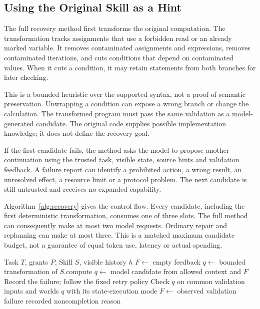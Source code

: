 \documentclass[conference]{IEEEtran}
\begin{document}
\subsection{Using the Original Skill as a Hint}
The full recovery method first transforms the original computation. The transformation tracks assignments that use a forbidden read or an already marked variable. It removes contaminated assignments and expressions, removes contaminated iterations, and cuts conditions that depend on contaminated values. When it cuts a condition, it may retain statements from both branches for later checking.

This is a bounded heuristic over the supported syntax, not a proof of semantic preservation. Unwrapping a condition can expose a wrong branch or change the calculation. The transformed program must pass the same validation as a model-generated candidate. The original code supplies possible implementation knowledge; it does not define the recovery goal.

If the first candidate fails, the method asks the model to propose another continuation using the trusted task, visible state, source hints and validation feedback. A failure report can identify a prohibited action, a wrong result, an unresolved effect, a resource limit or a protocol problem. The next candidate is still untrusted and receives no expanded capability.

Algorithm~\ref{alg:recovery} gives the control flow. Every candidate, including the first deterministic transformation, consumes one of three slots. The full method can consequently make at most two model requests. Ordinary repair and replanning can make at most three. This is a matched maximum candidate budget, not a guarantee of equal token use, latency or actual spending.

\begin{algorithm}[t]
\caption{Bounded recovery after a Skill is blocked}
\label{alg:recovery}
\begin{algorithmic}[1]
\Require Task $T$, grants $P$, Skill $S$, visible history $h$
\State $F \gets$ empty feedback
    \State $q \gets$ bounded transformation of $S.\mathrm{compute}$
  \Else
    \State $q \gets$ model candidate from allowed context and $F$
  \EndIf
    \State Record the failure; follow the fixed retry policy
  \Else
    \State Check $q$ on common validation inputs and worlds
      \State \Return $q$ with its state-execution mode
    \EndIf
    \State $F \gets$ observed validation failure
  \EndIf
\EndFor
\State \Return recorded noncompletion reason
\end{algorithmic}
\end{algorithm}
\end{document}
